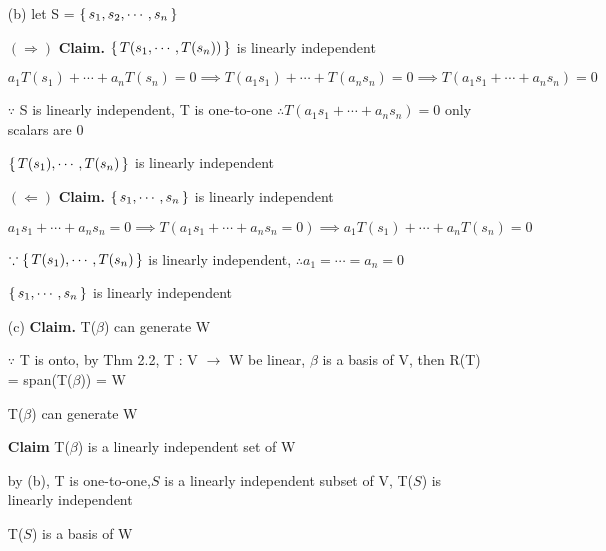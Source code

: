 \begin{tcolorbox}
	\begin{enumerate}
		\item[(b)] let S = $\left\{ \,s_1,s_2,\cdots,s_n \,\right\}$
		
		$(\Rightarrow)$ \textbf{Claim.} $\left\{ \,T(s_1,\cdots,T(s_n)) \,\right\}$ is linearly independent
		
		$a_1T(s_1)+\cdots+a_nT(s_n)=0 \implies T(a_1s_1)+\cdots+T(a_ns_n) = 0 \implies T(a_1s_1+\cdots+a_ns_n) = 0$
		
		$\because$ S is linearly independent, T is one-to-one $\therefore T(a_1s_1 + \cdots + a_ns_n) =0$ only scalars are $0$
		
		$\left\{ \,T(s_1),\cdots,T(s_n) \,\right\}$ is linearly independent
		
		$(\Leftarrow)$ \textbf{Claim.} $\left\{ \,s_1,\cdots,s_n \,\right\}$ is linearly independent
		
		$a_1s_1+\cdots+a_ns_n = 0 \implies T(a_1s_1+\cdots+a_ns_n=0)\implies a_1T(s_1) + \cdots + a_nT(s_n) = 0$
		
		$\because \left\{ \,T(s_1),\cdots,T(s_n) \,\right\}$ is linearly independent, $\therefore a_1=\cdots=a_n=0$
		
		$\left\{ \,s_1,\cdots,s_n \,\right\}$ is linearly independent
		
		\item[(c)] \textbf{Claim.} T($\beta$) can generate W
		
		$\because$ T is onto, by Thm 2.2, T : V $\rightarrow$ W be linear, $\beta$ is a basis of V, then R(T) = span(T($\beta$)) = W
		
		T($\beta$) can generate W
		
		\textbf{Claim} T($\beta$) is a linearly independent set of W
		
		by (b), T is one-to-one,$S$ is a linearly independent subset of V, T($S$) is linearly independent
		
		T($S$) is a basis of W
	\end{enumerate}
\end{tcolorbox}